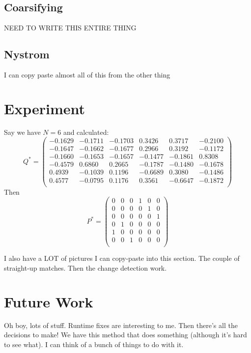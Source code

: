 \message{ !name(Research_Statement.tex)}\documentclass{article}[11pt]
\begin{document}
\subsection{Coarsifying}

NEED TO WRITE THIS ENTIRE THING

\subsection{Nystrom}

I can copy paste almost all of this from the other thing

\section{Experiment}
\label{sec:experiment}

Say we have $N=6$ and calculated:
\[Q^* = \begin{pmatrix}
    -0.1629 &  -0.1711 &  -0.1703 &   0.3426 &   0.3717 &  -0.2100\\
    -0.1647 &  -0.1662 &  -0.1677 &   0.2966 &   0.3192 &  -0.1172\\
    -0.1660 &  -0.1653 &  -0.1657 &  -0.1477 &  -0.1861 &   0.8308\\
    -0.4579 &   0.6860 &   0.2665 &  -0.1787 &  -0.1480 &  -0.1678\\
    0.4939 &  -0.1039 &   0.1196 &  -0.6689 &   0.3080 &  -0.1486\\
    0.4577 &  -0.0795 &   0.1176 &   0.3561 &  -0.6647 &  -0.1872\\
  \end{pmatrix}\]
Then \[P^* = \begin{pmatrix}
    0&0&0&1&0&0\\
    0&0&0&0&1&0\\
    0&0&0&0&0&1\\
    0&1&0&0&0&0\\
    1&0&0&0&0&0\\
    0&0&1&0&0&0\\
  \end{pmatrix}
\]

I also have a LOT of pictures I can copy-paste into this section. The couple of straight-up matches. Then the change detection work.

\section{Future Work}
\label{sec:futurework}

Oh boy, lots of stuff. Runtime fixes are interesting to me. Then there's all the decisions to make! We have this method that does something (although it's hard to see what). I can think of a bunch of things to do with it.

 
\end{document}
